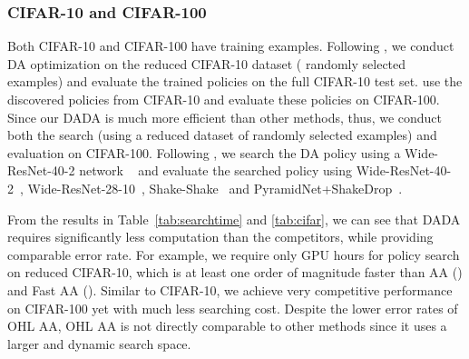 \documentclass[runningheads]{llncs}
\begin{document}
\subsubsection{CIFAR-10 and CIFAR-100}
Both CIFAR-10 and CIFAR-100 have  training examples. { Following \cite{DBLP:conf/cvpr/CubukZMVL19,DBLP:conf/icml/HoLCSA19,DBLP:conf/nips/LimKKKK19}, we conduct DA optimization on the reduced CIFAR-10 dataset ( randomly selected examples) and evaluate the trained policies on the full CIFAR-10 test set. \cite{DBLP:conf/cvpr/CubukZMVL19,DBLP:conf/icml/HoLCSA19, DBLP:conf/nips/LimKKKK19} use the discovered policies from CIFAR-10 and evaluate these policies on CIFAR-100. Since our DADA is much more efficient than other methods, thus, we conduct both the search (using a reduced dataset of  randomly selected examples) and evaluation on CIFAR-100.} 
Following \cite{DBLP:conf/cvpr/CubukZMVL19,DBLP:conf/icml/HoLCSA19, DBLP:conf/nips/LimKKKK19}, we
search the DA policy using a Wide-ResNet-40-2 network ~\cite{DBLP:conf/bmvc/ZagoruykoK16}
and evaluate the searched
policy using Wide-ResNet-40-2~\cite{DBLP:conf/bmvc/ZagoruykoK16}, Wide-ResNet-28-10~\cite{DBLP:conf/bmvc/ZagoruykoK16}, Shake-Shake~\cite{DBLP:conf/iclr/Gastaldi17} and PyramidNet+ShakeDrop~\cite{DBLP:journals/access/YamadaIAK19}. 


From the results in Table~\ref{tab:searchtime} and \ref{tab:cifar}, we can see that DADA requires significantly less computation than the competitors, while providing comparable error rate. For example, we require only  GPU hours for  policy search on  reduced CIFAR-10, which is at least one order of magnitude  faster than AA () and Fast AA (). Similar to CIFAR-10, we achieve very competitive performance  on  CIFAR-100 yet with much less searching cost.  
Despite the lower error rates of OHL AA, 
 OHL AA is not directly comparable to other methods since it uses a larger and dynamic search space. 
\end{document}
